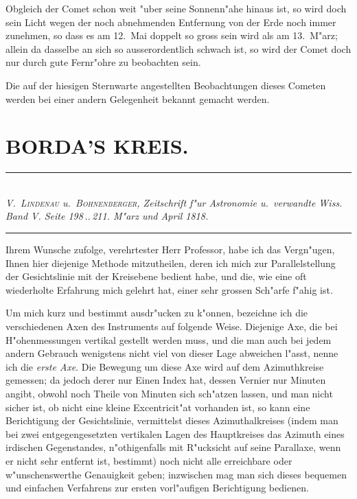 \documentclass[12pt,a4paper]{article}
\begin{document}
Obgleich der Comet schon weit "uber seine Sonnenn"ahe hinaus ist, so wird doch sein Licht wegen der
noch abnehmenden Entfernung von der Erde noch immer zunehmen, so dass es am 12.~Mai doppelt so gross
sein wird als am 13.~M"arz; allein da dasselbe an sich so ausserordentlich schwach ist, so wird der Comet
doch nur durch gute Fernr"ohre zu beobachten sein.

Die auf der hiesigen Sternwarte angestellten Beobachtungen dieses Cometen werden bei einer andern
Gelegenheit bekannt gemacht werden.

\newpage

\section*{BORDA'S KREIS.}

\begin{center}
\rule{0.6\textwidth}{0.4pt}\\[0.5em]
\textit{V.~\textsc{Lindenau} u.~\textsc{Bohnenberger}, Zeitschrift f"ur Astronomie u.~verwandte Wiss.}\\
\textit{Band V. Seite 198\,..\,211. M"arz und April 1818.}\\[0.3em]
\rule{0.6\textwidth}{0.4pt}
\end{center}

Ihrem Wunsche zufolge, verehrtester Herr Professor, habe ich das Vergn"ugen, Ihnen hier diejenige
Methode mitzutheilen, deren ich mich zur Parallelstellung der Gesichtslinie mit der Kreisebene bedient
habe, und die, wie eine oft wiederholte Erfahrung mich gelehrt hat, einer sehr grossen Sch"arfe f"ahig ist.

Um mich kurz und bestimmt ausdr"ucken zu k"onnen, bezeichne ich die verschiedenen Axen des Instruments
auf folgende Weise. Diejenige Axe, die bei H"ohenmessungen vertikal gestellt werden muss,
und die man auch bei jedem andern Gebrauch wenigstens nicht viel von dieser Lage abweichen l"asst,
nenne ich die \textit{erste Axe}. Die Bewegung um diese Axe wird auf dem Azimuthkreise gemessen; da jedoch
derer nur Einen Index hat, dessen Vernier nur Minuten angibt, obwohl noch Theile von Minuten sich
sch"atzen lassen, und man nicht sicher ist, ob nicht eine kleine Excentricit"at vorhanden ist, so kann eine
Berichtigung der Gesichtslinie, vermittelst dieses Azimuthalkreises (indem man bei zwei entgegengesetzten
vertikalen Lagen des Hauptkreises das Azimuth eines irdischen Gegenstandes, n"othigenfalls mit R"ucksicht
auf seine Parallaxe, wenn er nicht sehr entfernt ist, bestimmt) noch nicht alle erreichbare oder w"unschenswerthe
Genauigkeit geben; inzwischen mag man sich dieses bequemen und einfachen Verfahrens zur ersten
vorl"aufigen Berichtigung bedienen.
\end{document}

